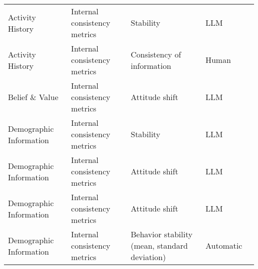 \begin{small}
\begin{center}
\begin{longtable}{@{}p{}p{}p{}p{}p{}@{}}
Activity History        & Internal consistency metrics        & Stability                                                                                                                                   & LLM               & \cite{shao2023character}                                                                                                                  \\
Activity History        & Internal consistency metrics        & Consistency of information                                                                                                                  & Human             & \cite{10.1145/3613904.3642363}                                                                                                                  \\
Belief \& Value        & Internal consistency metrics        & Attitude shift                                                                                                                              & LLM               & \cite{wang2024connecting}                                                                                                                              \\
Demographic Information & Internal consistency metrics        & Stability                                                                                                                                   & LLM               & \cite{shao2023character}                                                                                                                  \\
Demographic Information & Internal consistency metrics        & Attitude shift                                                                                                                              & LLM               & \cite{neuberger2024sauce}                                                                                                                              \\
Demographic Information & Internal consistency metrics        & Attitude shift                                                                                                                              & LLM               & \cite{taubenfeld-etal-2024-systematic}                                                                                                                               \\
Demographic Information & Internal consistency metrics        & Behavior stability (mean, standard deviation)                                                                                               & Automatic         & \cite{Wang2024IntelligentCS}                                                                                                                              \\

\end{longtable}
\end{center}
\end{small}
